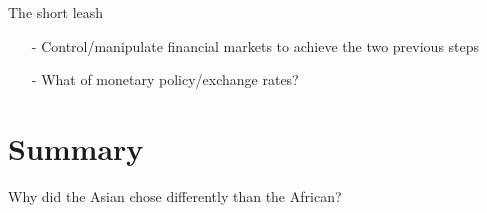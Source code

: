 \documentclass{beamer}
\begin{document}
\begin{frame}{The short leash}

	\begin{itemize}
		\item[-] Control/manipulate financial markets to achieve the
			two previous steps \pause
		\item[-] What of monetary policy/exchange rates?
	\end{itemize}

\end{frame}

\section{Summary}

\begin{frame}{}

	Why did the Asian chose differently than the African?


\end{frame}
\end{document}
